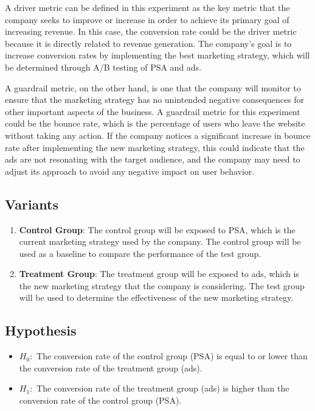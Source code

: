 \documentclass{article}
\begin{document}
A driver metric can be defined in this experiment as the key metric that the company seeks to improve or increase in order to achieve its primary goal of increasing revenue. In this case, the conversion rate could be the driver metric because it is directly related to revenue generation. The company's goal is to increase conversion rates by implementing the best marketing strategy, which will be determined through A/B testing of PSA and ads. \par

A guardrail metric, on the other hand, is one that the company will monitor to ensure that the marketing strategy has no unintended negative consequences for other important aspects of the business. A guardrail metric for this experiment could be the bounce rate, which is the percentage of users who leave the website without taking any action. If the company notices a significant increase in bounce rate after implementing the new marketing strategy, this could indicate that the ads are not resonating with the target audience, and the company may need to adjust its approach to avoid any negative impact on user behavior. \par

\subsection*{Variants} \par

\begin{enumerate}
    \item \textbf{Control Group}: The control group will be exposed to PSA, which is the current marketing strategy used by the company. The control group will be used as a baseline to compare the performance of the test group.
    \item \textbf{Treatment Group}: The treatment group will be exposed to ads, which is the new marketing strategy that the company is considering. The test group will be used to determine the effectiveness of the new marketing strategy.
\end{enumerate}

\subsection*{Hypothesis} \par

\begin{itemize}
    \item $H_0:$ The conversion rate of the control group (PSA) is equal to or lower than the conversion rate of the treatment group (ads).
    \item $H_1:$ The conversion rate of the treatment group (ads) is higher than the conversion rate of the control group (PSA).
\end{itemize}
\end{document}
